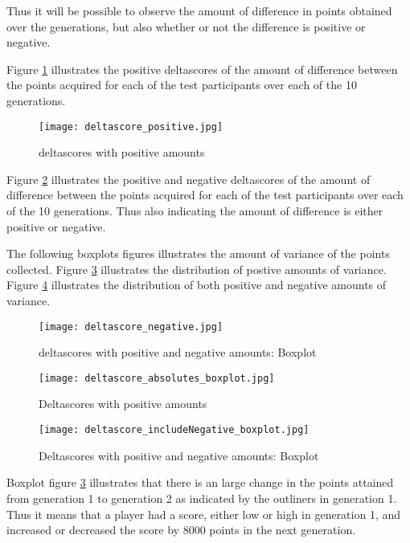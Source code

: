 Thus it will be possible to observe the amount of difference in points obtained over the generations, but also whether or not the difference is positive or negative.

Figure \ref{fig:deltascore_positive} illustrates the positive deltascores of the amount of difference between the points acquired for each of the test participants over each of the 10 generations.

\begin{figure}[h!]
\centering
\texttt{[image: deltascore\_positive.jpg]}
\caption{deltascores with positive amounts}
\label{fig:deltascore_positive}
\end{figure}


Figure \ref{fig:deltascore_negative} illustrates the positive and negative deltascores of the amount of difference between the points acquired for each of the test participants over each of the 10 generations. Thus also indicating the amount of difference is either positive or negative.

The following boxplots figures illustrates the amount of variance of the points collected. Figure \ref{fig:delta_positive} illustrates the distribution of postive amounts of variance. Figure \ref{fig:delta_negative} illustrates the distribution of both positive and negative amounts of variance.

\begin{figure}[h!]
\centering
\texttt{[image: deltascore\_negative.jpg]}
\caption{deltascores with positive and negative amounts: Boxplot}
\label{fig:deltascore_negative}
\end{figure}






\begin{figure}[h!]
\centering
\texttt{[image: deltascore\_absolutes\_boxplot.jpg]}
\caption{Deltascores with positive amounts}
\label{fig:delta_positive}
\end{figure}


\begin{figure}[h!]
\centering
\texttt{[image: deltascore\_includeNegative\_boxplot.jpg]}
\caption{Deltascores with positive and negative amounts: Boxplot}
\label{fig:delta_negative}
\end{figure}

Boxplot figure \ref{fig:delta_positive} illustrates that there is an large change in the points attained from generation 1 to generation 2 as indicated by the outliners in generation 1. Thus it means that a player had a score, either low or high in generation 1, and increased or decreased the score by 8000 points in the next generation.

